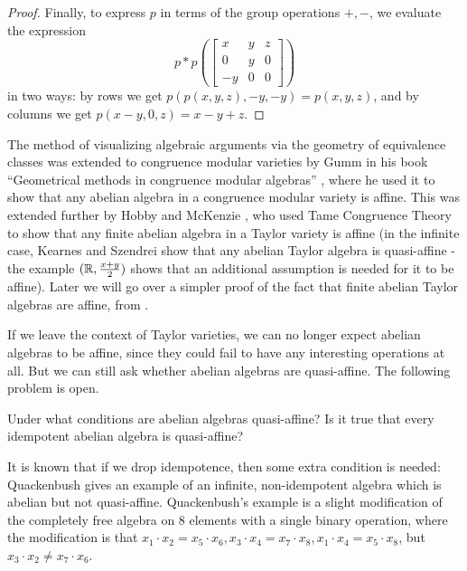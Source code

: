 \documentclass[letterpaper,11pt]{article}
\begin{document}
\begin{proof}
Finally, to express $p$ in terms of the group operations $+,-$, we evaluate the expression
\[
p*p\left(\begin{bmatrix} x & y & z\\ 0 & y & 0\\ -y & 0 & 0\end{bmatrix}\right)
\]
in two ways: by rows we get $p(p(x,y,z),-y,-y) = p(x,y,z)$, and by columns we get $p(x-y,0,z) = x-y+z$.
\end{proof}

The method of visualizing algebraic arguments via the geometry of equivalence classes was extended to congruence modular varieties by Gumm in his book ``Geometrical methods in congruence modular algebras'' \cite{gumm-geometric}, where he used it to show that any abelian algebra in a congruence modular variety is affine. This was extended further by Hobby and McKenzie \cite{hobby-mckenzie}, who used Tame Congruence Theory to show that any finite abelian algebra in a Taylor variety is affine (in the infinite case, Kearnes and Szendrei \cite{kearnes-taylor-affine} show that any abelian Taylor algebra is quasi-affine - the example $(\mathbb{R}, \frac{x+y}{2})$ shows that an additional assumption is needed for it to be affine). Later we will go over a simpler proof of the fact that finite abelian Taylor algebras are affine, from \cite{pointing-no-absorption}.

\begin{rem} If we leave the context of Taylor varieties, we can no longer expect abelian algebras to be affine, since they could fail to have any interesting operations at all. But we can still ask whether abelian algebras are quasi-affine. The following problem is open.
\end{rem}

\begin{prob} Under what conditions are abelian algebras quasi-affine? Is it true that every idempotent abelian algebra is quasi-affine?
\end{prob}

It is known that if we drop idempotence, then some extra condition is needed: Quackenbush \cite{quasi-affine-quackenbush} gives an example of an infinite, non-idempotent algebra which is abelian but not quasi-affine. Quackenbush's example is a slight modification of the completely free algebra on $8$ elements with a single binary operation, where the modification is that $x_1 \cdot x_2 = x_5 \cdot x_6, x_3 \cdot x_4 = x_7 \cdot x_8, x_1\cdot x_4 = x_5 \cdot x_8$, but $x_3 \cdot x_2 \ne x_7 \cdot x_6$.
\end{document}
